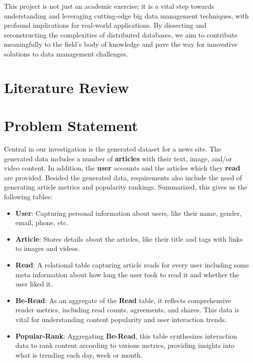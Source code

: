 \documentclass{report}
\begin{document}
    This project is not just an academic exercise; it is a vital step towards understanding and leveraging cutting-edge big data management techniques, with profound implications for real-world applications. By dissecting and reconstructing the complexities of distributed databases, we aim to contribute meaningfully to the field's body of knowledge and pave the way for innovative solutions to data management challenges.


    \section{Literature Review}


    \section{Problem Statement}
    Central in our investigation is the generated dataset for a news site. The generated data includes a number of \textbf{articles} with their text, image, and/or video content. In addition, the \textbf{user} accounts and the articles which they \textbf{read} are provided. Besided the generated data, requirements also include the need of generating article metrics and popularity rankings. Summarized, this gives us the following tables:

    \begin{itemize}
        \item \textbf{User}: Capturing personal information about users, like their name, gender, email, phone, etc.
        \item \textbf{Article}: Stores details about the articles, like their title and tags with links to images and videos.
        \item \textbf{Read}: A relational table capturing article reads for every user including some meta information about how long the user took to read it and whether the user liked it.
        \item \textbf{Be-Read}: As an aggregate of the \textbf{Read} table, it reflects comprehensive reader metrics, including read counts, agreements, and shares. This data is vital for understanding content popularity and user interaction trends.
        \item \textbf{Popular-Rank}: Aggregating \textbf{Be-Read}, this table synthesizes interaction data to rank content according to various metrics, providing insights into what is trending each day, week or month.
    \end{itemize}
\end{document}

